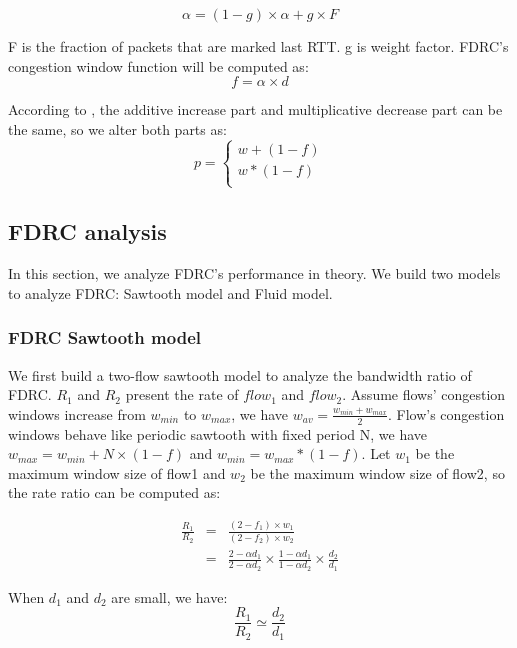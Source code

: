 \documentclass[10pt, conference, letterpaper]{IEEEtran}
\begin{document}
\begin{equation}
\label{alpha}
\alpha=(1-g) \times \alpha+g\times F
\end{equation}

F is the fraction of packets that are marked last RTT.  g is weight factor. FDRC's congestion window function will be computed as:
\begin{equation}
\label{factor}
f=\alpha \times d
\end{equation}

According to \cite{LPD}, the additive increase part and multiplicative decrease part can be the same,  so we alter both parts as:
\begin{equation}
\label{ca}
 p=\left\{
\begin{array}{rcl}
w+(1-f)\\
w*(1-f) \\
\end{array} \right. 
\end{equation}

\subsection{FDRC analysis}
In this section, we analyze FDRC's performance in theory. 
We build two models to analyze FDRC: Sawtooth model and Fluid model.

\subsubsection{FDRC Sawtooth model}
We first build a two-flow sawtooth model \cite{LPD} to analyze the bandwidth ratio of FDRC.
$R_{1}$ and $R_{2}$ present the rate of $flow_1$ and $flow_2$.
Assume flows' congestion windows increase from $w_{min}$ to $w_{max}$, we have $w_{av}=\frac{w_{min}+w_{max}}{2}$.
Flow's congestion windows  behave like periodic sawtooth with fixed period
N, we have $w_{max}=w_{min}+N \times(1-f)$ and $w_{min}=w_{max}*(1-f)$. Let $w_{1}$ be the maximum window size of flow1
and $w_{2}$ be the maximum window size of flow2, so the rate ratio can be computed as:

\begin{eqnarray}
\frac{R_{1}}{R_{2}} &=&\frac{(2-f_1)\times w_1}{(2-f_2)\times w_2}  \nonumber \\
&=& \frac{2-\alpha d_1}{2-\alpha d_2}\times \frac{1-\alpha d_1}{1-
\alpha d_2}\times \frac{d_2}{d_1}\nonumber
\end{eqnarray}

When $d_1$ and $d_2$ are small, we have:
\begin{equation}
\label{Ratio}
\frac{R_1}{R_2} \simeq \frac{d_2}{d_1}
\end{equation}
\end{document}

